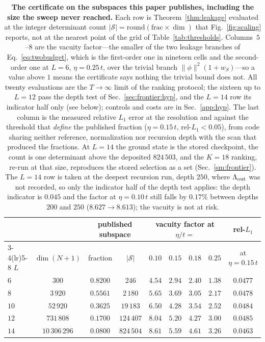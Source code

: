 \begin{table}[tp]\centering\small
\caption{\textbf{The certificate on the subspaces this paper publishes, including the size the sweep
never reached.} Each row is Theorem~\ref{thm:leakage} evaluated at the integer determinant count
$\lvert\mathcal S\rvert=\mathrm{round}(\mathrm{frac}\times\dim)$ that Fig.~\ref{fig:scaling} reports,
not at the nearest point of the grid of Table~\ref{tab:thresholds}. Columns~$5$--$8$ are the vacuity
factor---the smaller of the two leakage branches of Eq.~\eqref{eq:twobudget}, which is the first-order one in
nineteen cells and the second-order one at $L=6$, $\eta=0.25\,t$, over the trivial branch
$\lVert\phi\rVert^{2}(1+w_S)$---so a value above $1$ means the certificate says nothing the trivial
bound does not. All twenty evaluations are the $T\to\infty$ limit of the ranking protocol; the sixteen up to
$L=12$ pass the depth test of Sec.~\ref{sec:frontier:hyp}, and the $L=14$ row its indicator half only
(see below); controls and costs are in Sec.~\ref{app:hyp}. The last column is the measured
relative $L_1$ error at the resolution and against the threshold that \emph{define} the published
fraction ($\eta=0.15\,t$, rel-$L_1<0.05$), from code sharing neither reference, normalization nor
recursion depth with the scan that produced the fractions. At $L=14$ the ground state is the stored checkpoint, the count is one determinant above the deposited $824\,503$, and the $K=18$ ranking, re-run at that size, reproduces the stored selection as a set (Sec.~\ref{sm:frontier}). The $L=14$ row is taken at the deepest recursion run, depth $250$, where $\Lambda_{\rm out}$ was not recorded, so only the indicator half of the depth test applies: the depth indicator is $0.045$ and the factor at $\eta=0.10\,t$ still falls by $0.17\%$ between depths $200$ and $250$ ($8.627\to8.613$); the vacuity is not at risk.}\label{tab:published}
\setlength{\tabcolsep}{6pt}
\begin{tabular}{lcccccccc}
\toprule
 & & \multicolumn{2}{c}{published subspace} & \multicolumn{4}{c}{vacuity factor at $\eta/t=$} & rel-$L_1$\\
\cmidrule(lr){3-4}\cmidrule(lr){5-8}
$L$ & $\dim(N{+}1)$ & fraction & $\lvert\mathcal S\rvert$ & $0.10$ & $0.15$ & $0.18$ & $0.25$ & at $\eta=0.15\,t$\\
\midrule
$6$  & $300$          & $0.8200$ & $246$      & $4.54$ & $2.94$ & $2.40$ & $1.38$ & $0.0477$\\
$8$  & $3\,920$       & $0.5561$ & $2\,180$   & $5.65$ & $3.69$ & $3.05$ & $2.17$ & $0.0478$\\
$10$ & $52\,920$      & $0.3625$ & $19\,183$  & $6.50$ & $4.28$ & $3.54$ & $2.52$ & $0.0484$\\
$12$ & $731\,808$     & $0.1700$ & $124\,407$ & $8.04$ & $5.20$ & $4.27$ & $3.00$ & $0.0485$\\
$14$ & $10\,306\,296$ & $0.0800$ & $824\,504$ & $8.61$ & $5.59$ & $4.61$ & $3.26$ & $0.0463$\\
\bottomrule
\end{tabular}
\end{table}

